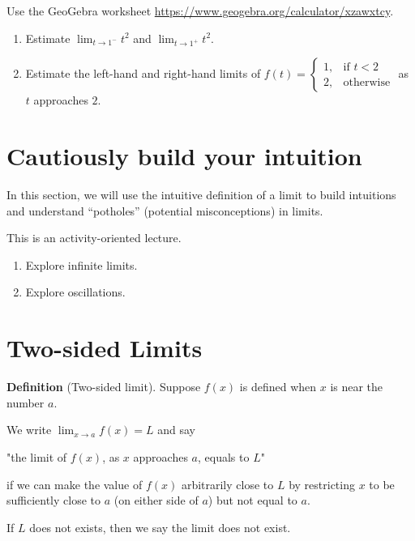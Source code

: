 \documentclass[../main.tex]{subfiles}
\begin{document}
\begin{example} \label{activity:one-sided}
  Use the GeoGebra worksheet \url{https://www.geogebra.org/calculator/xzawxtcy}.
  \begin{enumerate}[label=(\alph*)]
    \item Estimate \(\lim_{t \to 1^{-}} t^{2}\) and \(\lim_{t \to 1^{+}} t^{2}\).
          \vfill{}

    \item \label{part:piecewise} Estimate the left-hand and right-hand limits of \(f(t) =
          \begin{cases}
            1, & \text{if } t < 2 \\
            2, & \text{otherwise}
          \end{cases}\) as \(t\) approaches \(2\).
          \vfill{}
  \end{enumerate}
\end{example}


\section{Cautiously build your intuition}

In this section, we will use the intuitive definition of a limit to build intuitions and understand ``potholes'' (potential misconceptions) in limits. 

This is an activity-oriented lecture. 

\begin{enumerate}
  \item Explore infinite limits.
  \item Explore oscillations. 
\end{enumerate}

\section{Two-sided Limits}
\begin{mdframed}[style=withref]
  \textbf{Definition} (Two-sided limit). Suppose \(f(x)\) is {defined when \(x\) is near the number \(a\).}

  We write \({\lim_{x \to a} f(x)} = L\) and say
  \begin{center}
    "the {limit} of \(f(x)\), as {\(x\) approaches \(a\)}, equals to \(L\)"
  \end{center}
  if we can {make the value of \(f(x)\) arbitrarily close to \(L\) by restricting \(x\) to be sufficiently close to \(a\) (on either side of \(a\))} {but not equal to \(a\).}

  If \(L\) does not exists, then we say the limit {does not exist.}

\end{mdframed}
\end{document}
